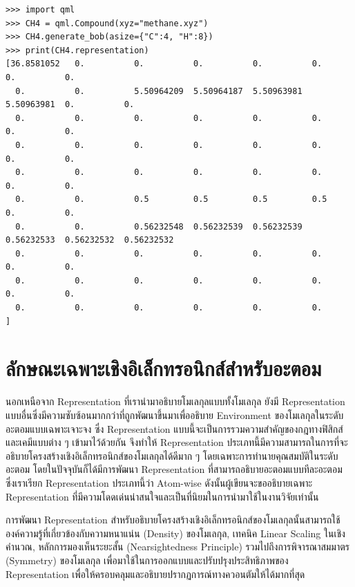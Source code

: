 \begin{lstlisting}[style=MyPython]
>>> import qml
>>> CH4 = qml.Compound(xyz="methane.xyz")
>>> CH4.generate_bob(asize={"C":4, "H":8})
>>> print(CH4.representation)
[36.8581052   0.          0.          0.          0.          0.          0.          0.
  0.          0.          5.50964209  5.50964187  5.50963981  5.50963981  0.          0.
  0.          0.          0.          0.          0.          0.          0.          0.
  0.          0.          0.          0.          0.          0.          0.          0.
  0.          0.          0.          0.          0.          0.          0.          0.
  0.          0.          0.5         0.5         0.5         0.5         0.          0.
  0.          0.          0.56232548  0.56232539  0.56232539  0.56232533  0.56232532  0.56232532
  0.          0.          0.          0.          0.          0.          0.          0.
  0.          0.          0.          0.          0.          0.          0.          0.
  0.          0.          0.          0.          0.          0.        ]
\end{lstlisting}

\section{ลักษณะเฉพาะเชิงอิเล็กทรอนิกส์สำหรับอะตอม}
\label{sec:elec_feat}

นอกเหนือจาก Representation ที่เรานำมาอธิบายโมเลกุลแบบทั้งโมเลกุล ยังมี Representation แบบอื่นซึ่งมีความซับซ้อนมากกว่าที่ถูกพัฒนาขึ้นมาเพื่ออธิบาย Environment ของโมเลกุลในระดับอะตอมแบบเฉพาะเจาะจง ซึ่ง Representation แบบนี้จะเป็นการรวมความสำคัญของกฎทางฟิสิกส์และเคมีแบบต่าง ๆ เข้ามาไว้ด้วยกัน จึงทำให้ Representation ประเภทนี้มีความสามารถในการที่จะอธิบายโครงสร้างเชิงอิเล็กทรอนิกส์ของโมเลกุลได้ดีมาก ๆ โดยเฉพาะการทำนายคุณสมบัติในระดับอะตอม โดยในปัจจุบันก็ได้มีการพัฒนา Representation ที่สามารถอธิบายอะตอมแบบทีละอะตอม ซึ่งเราเรียก Representation ประเภทนี้ว่า Atom-wise ดังนั้นผู้เขียนจะขออธิบายเฉพาะ Representation ที่มีความโดดเด่นน่าสนใจและเป็นที่นิยมในการนำมาใช้ในงานวิจัยเท่านั้น

การพัฒนา Representation สำหรับอธิบายโครงสร้างเชิงอิเล็กทรอนิกส์ของโมเลกุลนั้นสามารถใช้องค์ความรู้ที่เกี่ยวข้องกับความหนาแน่น (Density) ของโมเลกุล\autocite{yang1991}, เทคนิค Linear Scaling ในเชิงคำนวณ\autocite{galli1992,goedecker1999}, หลักการมองเห็นระยะสั้น (Nearsightedness Principle)\autocite{prodan2005} รวมไปถึงการพิจารณาสมมาตร (Symmetry) ของโมเลกุล เพื่อมาใช้ในการออกแบบและปรับปรุงประสิทธิภาพของ Representation เพื่อให้ครอบคลุมและอธิบายปรากฏการณ์ทางควอนตัมให้ได้มากที่สุด\autocite{ceriotti2018}

